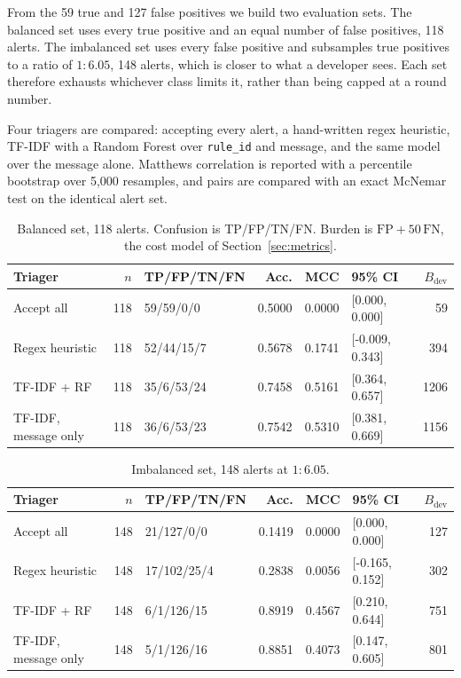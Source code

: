 \documentclass[journal]{IEEEtran}
\theoremstyle{definition}
\newcommand{\RNtp}{59}
\newcommand{\RNfp}{127}
\newcommand{\RNbal}{118}
\newcommand{\RNimb}{148}
\newcommand{\RImbRatio}{6.05}
\newcommand{\RBoot}{5{,}000}
\begin{document}
From the \RNtp{} true and \RNfp{} false positives we build two evaluation sets.
The balanced set uses every true positive and an equal number of false
positives, \RNbal{} alerts. The imbalanced set uses every false positive and
subsamples true positives to a ratio of $1{:}\RImbRatio$, \RNimb{} alerts,
which is closer to what a developer sees. Each set therefore exhausts whichever
class limits it, rather than being capped at a round number.

Four triagers are compared: accepting every alert, a hand-written regex
heuristic, TF-IDF with a Random Forest over \texttt{rule\_id} and message, and
the same model over the message alone. Matthews correlation is reported with a
percentile bootstrap over \RBoot{} resamples, and pairs are compared with an
exact McNemar test on the identical alert set.

\begin{table}[t]
\caption{Balanced set, \RNbal{} alerts. Confusion is TP/FP/TN/FN. Burden is
$\mathrm{FP} + 50\,\mathrm{FN}$, the cost model of
Section~\ref{sec:metrics}.}
\label{tab:realbal}
\centering
\footnotesize
\setlength{\tabcolsep}{3.5pt}
\begin{tabular}{lrlrrlr}
\toprule
Triager & $n$ & TP/FP/TN/FN & Acc. & MCC & 95\% CI & $B_{\mathrm{dev}}$ \\
\midrule
Accept all & 118 & 59/59/0/0 & 0.5000 & 0.0000 & [0.000, 0.000] & 59 \\
Regex heuristic & 118 & 52/44/15/7 & 0.5678 & 0.1741 & [-0.009, 0.343] & 394 \\
TF-IDF + RF & 118 & 35/6/53/24 & 0.7458 & 0.5161 & [0.364, 0.657] & 1206 \\
TF-IDF, message only & 118 & 36/6/53/23 & 0.7542 & 0.5310 & [0.381, 0.669] & 1156 \\
\bottomrule
\end{tabular}
\end{table}

\begin{table}[t]
\caption{Imbalanced set, \RNimb{} alerts at $1{:}\RImbRatio$.}
\label{tab:realimb}
\centering
\footnotesize
\setlength{\tabcolsep}{3.5pt}
\begin{tabular}{lrlrrlr}
\toprule
Triager & $n$ & TP/FP/TN/FN & Acc. & MCC & 95\% CI & $B_{\mathrm{dev}}$ \\
\midrule
Accept all & 148 & 21/127/0/0 & 0.1419 & 0.0000 & [0.000, 0.000] & 127 \\
Regex heuristic & 148 & 17/102/25/4 & 0.2838 & 0.0056 & [-0.165, 0.152] & 302 \\
TF-IDF + RF & 148 & 6/1/126/15 & 0.8919 & 0.4567 & [0.210, 0.644] & 751 \\
TF-IDF, message only & 148 & 5/1/126/16 & 0.8851 & 0.4073 & [0.147, 0.605] & 801 \\
\bottomrule
\end{tabular}
\end{table}
\end{document}
